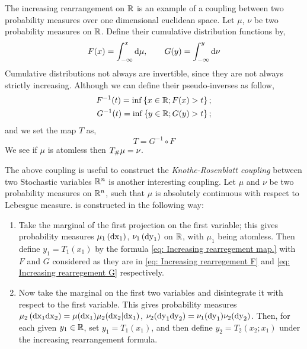 The increasing rearrangement on $\mathbb{R}$ is an example of a coupling between two probability measures over one dimensional euclidean space. Let $\mu$, $\nu$ be two probability measures on $\mathbb{R}$. Define their cumulative distribution functions by,
\begin{equation*}
	F(x)=\int_{-\infty}^{x}\mathrm{d}\mu, \qquad G(y)=\int_{-\infty}^{y}\mathrm{d}\nu	
\end{equation*}
Cumulative distributions not always are invertible, since they are not always strictly increasing. Although we can define their pseudo-inverses as follow,
\begin{align}
	F^{-1}(t)=\inf\left\lbrace x\in \mathbb{R}; F(x)>t \right\rbrace; \label{eq: Increasing rearregement F}\\
	G^{-1}(t)=\inf\left\lbrace y\in \mathbb{R}; G(y)>t \right\rbrace; \label{eq: Increasing rearregement G}
\end{align}
and we set the map $T$ as,
\begin{equation}
	T=G^{-1}\circ F \label{eq: Increasing rearregement map.}
\end{equation}
We see if $\mu$ is atomless then ${T}_{\#} \mu=\nu$.

The above coupling is useful to construct the \textit{Knothe-Rosenblatt coupling} between two Stochastic variables $\mathbb{R}^n$ is another interesting coupling. Let $\mu$ and $\nu$ be two probability measures on $\mathbb{R}^n$, such that $\mu$ is absolutely continuous with respect to Lebesgue measure.  is constructed in the following way:

\begin{enumerate}
	\item Take the marginal of the first projection on the first variable; this gives probability measures $\mu_1\left( \mathrm{dx}_1 \right)$, $\nu_1\left( \mathrm{dy}_1 \right)$ on $\mathbb{R}$, with $\mu_1$ being atomless. Then define $y_1=T_1(x_1)$ by the formula \eqref{eq: Increasing rearregement map.} with $F$ and $G$ considered as they are in \eqref{eq: Increasing rearregement F} and \eqref{eq: Increasing rearregement G} respectively.
	
	\item Now take the marginal on the first two variables and disintegrate it with respect to the first variable. This gives probability measures $\mu_2\left( \mathrm{dx}_1\mathrm{dx}_2 \right)=\mu(\mathrm{dx}_1)\mu_2(\mathrm{dx}_2 | \mathrm{dx}_1)$, $\nu_2 (\mathrm{dy}_1\mathrm{dy}_2)=\nu_1(\mathrm{dy}_1)\nu_2(\mathrm{dy}_2)$. Then, for each given $y_1\in \mathbb{R}$, set $y_1=T_1(x_1)$, and then define $y_2=T_2(x_2; x_1)$ under the increasing rearrangement formula.  
\end{enumerate} 


